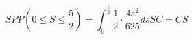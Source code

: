 \documentclass[12pt]{article}
\begin{document}
    \[
        SP P(0 \leq S \leq \frac{5}{2}) = \int_{0}^{\frac{5}{2}} \frac{1}{2} \cdot \frac{{4s^2}}{625} ds
         SC = CS
    \]
\end{document}
